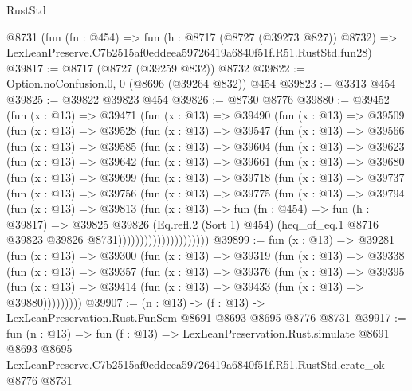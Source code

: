 \begin{lexlean}{RustStd}
\begin{coremodule}
    @8731
    (fun (fn : @454) =>
    fun (h : @8717 (@8727 (@39273 @827)) @8732) =>
    LexLeanPreserve.C7b2515af0eddeea59726419a6840f51f.R51.RustStd.fun28)
@39817 := @8717 (@8727 (@39259 @832)) @8732
@39822 := Option.noConfusion.{0, 0} (@8696 (@39264 @832)) @454
@39823 := @3313 @454
@39825 := @39822 @39823 @454
@39826 := @8730 @8776
@39880 := @39452
    (fun (x : @13) =>
    @39471
      (fun (x : @13) =>
      @39490
        (fun (x : @13) =>
        @39509
          (fun (x : @13) =>
          @39528
            (fun (x : @13) =>
            @39547
              (fun (x : @13) =>
              @39566
                (fun (x : @13) =>
                @39585
                  (fun (x : @13) =>
                  @39604
                    (fun (x : @13) =>
                    @39623
                      (fun (x : @13) =>
                      @39642
                        (fun (x : @13) =>
                        @39661
                          (fun (x : @13) =>
                          @39680
                            (fun (x : @13) =>
                            @39699
                              (fun (x : @13) =>
                              @39718
                                (fun (x : @13) =>
                                @39737
                                  (fun (x : @13) =>
                                  @39756
                                    (fun (x : @13) =>
                                    @39775
                                      (fun (x : @13) =>
                                      @39794
                                        (fun (x : @13) =>
                                        @39813
                                          (fun (x : @13) =>
                                          fun (fn : @454) =>
                                          fun (h : @39817) =>
                                          @39825
                                            @39826
                                            (Eq.refl.{2} (Sort 1) @454)
                                            (heq_of_eq.{1}
                                              @8716
                                              @39823
                                              @39826
                                              @8731)))))))))))))))))))))
@39899 := fun (x : @13) =>
  @39281
    (fun (x : @13) =>
    @39300
      (fun (x : @13) =>
      @39319
        (fun (x : @13) =>
        @39338
          (fun (x : @13) =>
          @39357
            (fun (x : @13) =>
            @39376
              (fun (x : @13) =>
              @39395
                (fun (x : @13) => @39414 (fun (x : @13) => @39433 (fun (x : @13) => @39880)))))))))
@39907 := (n : @13) -> (f : @13) -> LexLeanPreservation.Rust.FunSem @8691 @8693 @8695 @8776 @8731
@39917 := fun (n : @13) =>
  fun (f : @13) =>
  LexLeanPreservation.Rust.simulate
    @8691
    @8693
    @8695
    LexLeanPreserve.C7b2515af0eddeea59726419a6840f51f.R51.RustStd.crate_ok
    @8776
    @8731
\end{coremodule}
\end{lexlean}
